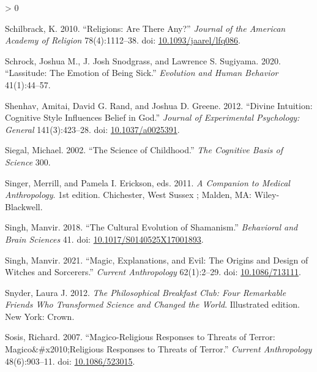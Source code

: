 \documentclass[
  11pt,
]{article}
\newlength{\cslhangindent}
\newenvironment{CSLReferences}[2] %
 {%
  \setlength{\parindent}{0pt}
  \ifodd #1 \everypar{\setlength{\hangindent}{\cslhangindent}}\ignorespaces\fi
  \ifnum #2 > 0
  \setlength{\parskip}{#2\baselineskip}
  \fi
 }%
 {}
\begin{document}
\begin{CSLReferences}{1}{0}
\leavevmode\hypertarget{ref-schilbrackReligionsAreThere2010}{}%
Schilbrack, K. 2010. {``Religions: {Are There Any}?''} \emph{Journal of the American Academy of Religion} 78(4):1112--38. doi: \href{https://doi.org/10.1093/jaarel/lfq086}{10.1093/jaarel/lfq086}.

\leavevmode\hypertarget{ref-schrock2020lassitude}{}%
Schrock, Joshua M., J. Josh Snodgrass, and Lawrence S. Sugiyama. 2020. {``Lassitude: The Emotion of Being Sick.''} \emph{Evolution and Human Behavior} 41(1):44--57.

\leavevmode\hypertarget{ref-shenhavDivineIntuitionCognitive2012}{}%
Shenhav, Amitai, David G. Rand, and Joshua D. Greene. 2012. {``Divine Intuition: {Cognitive} Style Influences Belief in {God}.''} \emph{Journal of Experimental Psychology: General} 141(3):423--28. doi: \href{https://doi.org/10.1037/a0025391}{10.1037/a0025391}.

\leavevmode\hypertarget{ref-siegal200216}{}%
Siegal, Michael. 2002. {``The Science of Childhood.''} \emph{The Cognitive Basis of Science} 300.

\leavevmode\hypertarget{ref-singerCompanionMedicalAnthropology2011}{}%
Singer, Merrill, and Pamela I. Erickson, eds. 2011. \emph{A {Companion} to {Medical Anthropology}}. 1st edition. {Chichester, West Sussex ; Malden, MA}: {Wiley-Blackwell}.

\leavevmode\hypertarget{ref-singhCulturalEvolutionShamanism2018}{}%
Singh, Manvir. 2018. {``The Cultural Evolution of Shamanism.''} \emph{Behavioral and Brain Sciences} 41. doi: \href{https://doi.org/10.1017/S0140525X17001893}{10.1017/S0140525X17001893}.

\leavevmode\hypertarget{ref-singhMagicExplanationsEvil2021}{}%
Singh, Manvir. 2021. {``Magic, {Explanations}, and {Evil}: {The Origins} and {Design} of {Witches} and {Sorcerers}.''} \emph{Current Anthropology} 62(1):2--29. doi: \href{https://doi.org/10.1086/713111}{10.1086/713111}.

\leavevmode\hypertarget{ref-snyderPhilosophicalBreakfastClub2012}{}%
Snyder, Laura J. 2012. \emph{The {Philosophical Breakfast Club}: {Four Remarkable Friends Who Transformed Science} and {Changed} the {World}}. Illustrated edition. {New York}: {Crown}.

\leavevmode\hypertarget{ref-sosisMagicoReligiousResponses2007}{}%
Sosis, Richard. 2007. {``Magico-{Religious Responses} to {Threats} of {Terror}: {Magico}\&\#x2010;{Religious Responses} to {Threats} of {Terror}.''} \emph{Current Anthropology} 48(6):903--11. doi: \href{https://doi.org/10.1086/523015}{10.1086/523015}.


\end{CSLReferences}
\end{document}
